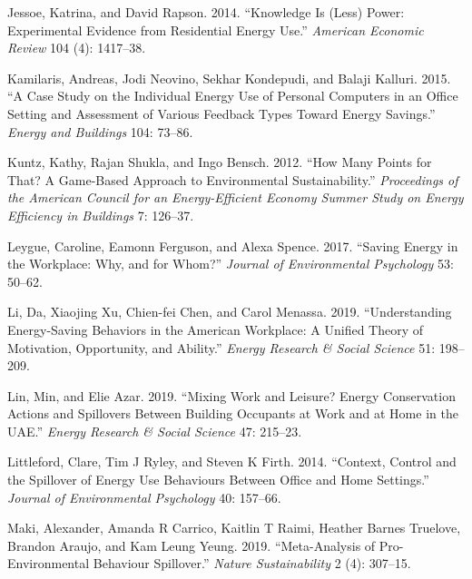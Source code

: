 \documentclass[
  12pt,
  captions=heading]{scrreport}
\newlength{\cslhangindent}
\newlength{\cslentryspacingunit} %
\newenvironment{CSLReferences}[2] %
 {%
  \setlength{\parindent}{0pt}
  \ifodd #1
  \let\oldpar\par
  \def\par{\hangindent=\cslhangindent\oldpar}
  \fi
  \setlength{\parskip}{#2\cslentryspacingunit}
 }%
 {}
\begin{document}
\begin{CSLReferences}{1}{0}
\leavevmode{}%
Jessoe, Katrina, and David Rapson. 2014. {``Knowledge Is (Less) Power:
Experimental Evidence from Residential Energy Use.''} \emph{American
Economic Review} 104 (4): 1417--38.

\leavevmode{}%
Kamilaris, Andreas, Jodi Neovino, Sekhar Kondepudi, and Balaji Kalluri.
2015. {``A Case Study on the Individual Energy Use of Personal Computers
in an Office Setting and Assessment of Various Feedback Types Toward
Energy Savings.''} \emph{Energy and Buildings} 104: 73--86.

\leavevmode{}%
Kuntz, Kathy, Rajan Shukla, and Ingo Bensch. 2012. {``How Many Points
for That? A Game-Based Approach to Environmental Sustainability.''}
\emph{Proceedings of the American Council for an Energy-Efficient
Economy Summer Study on Energy Efficiency in Buildings} 7: 126--37.

\leavevmode{}%
Leygue, Caroline, Eamonn Ferguson, and Alexa Spence. 2017. {``Saving
Energy in the Workplace: Why, and for Whom?''} \emph{Journal of
Environmental Psychology} 53: 50--62.

\leavevmode{}%
Li, Da, Xiaojing Xu, Chien-fei Chen, and Carol Menassa. 2019.
{``Understanding Energy-Saving Behaviors in the American Workplace: A
Unified Theory of Motivation, Opportunity, and Ability.''} \emph{Energy
Research \& Social Science} 51: 198--209.

\leavevmode{}%
Lin, Min, and Elie Azar. 2019. {``Mixing Work and Leisure? Energy
Conservation Actions and Spillovers Between Building Occupants at Work
and at Home in the UAE.''} \emph{Energy Research \& Social Science} 47:
215--23.

\leavevmode{}%
Littleford, Clare, Tim J Ryley, and Steven K Firth. 2014. {``Context,
Control and the Spillover of Energy Use Behaviours Between Office and
Home Settings.''} \emph{Journal of Environmental Psychology} 40:
157--66.

\leavevmode{}%
Maki, Alexander, Amanda R Carrico, Kaitlin T Raimi, Heather Barnes
Truelove, Brandon Araujo, and Kam Leung Yeung. 2019. {``Meta-Analysis of
Pro-Environmental Behaviour Spillover.''} \emph{Nature Sustainability} 2
(4): 307--15.


\end{CSLReferences}
\end{document}
